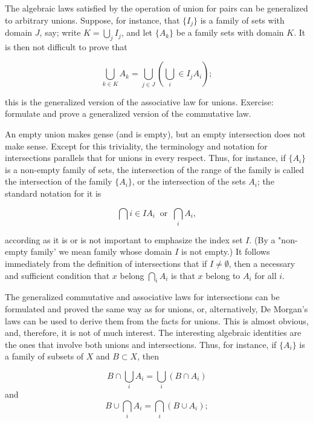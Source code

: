 The algebraic laws satisfied by the operation of union for pairs can be generalized to arbitrary unions. Suppose, for instance, that $ \{ I_{j} \}$ is a family of sets with domain $J$, say; write $K = \bigcup_{j}I_{j}$, and let $\{ A_{k} \}$ be a family sets with domain $K$. It is then not difficult to prove that 

\begin{equation*}
\bigcup_{k \in K}A_{k} = \bigcup_{j \in J}(\bigcup_{i} \in I_{j}A_{i});
\end{equation*}

this is the generalized version of the associative law for unions. Exercise: formulate and prove a generalized version of the commutative law. 

An empty union makes gense (and is empty), but an empty intersection does not make sense. Except for this triviality, the terminology and notation for intersections parallels that for unions in every respect. Thus, for instance, if $\{ A_{i} \}$ is a non-empty family of sets, the intersection of the range of the family is called the intersection of the family $\{ A_{i} \}$, or the intersection of the sets $A_{i}$; the standard notation for it is 

\begin{equation*}
\bigcap{i \in I}A_{i} \: \text{ or } \: \bigcap_{i}A_{i},
\end{equation*}

according as it is or is not important to emphasize the index set $I$. (By a "non-empty family' we mean family whose domain $I$ is not empty.) It follows immediately from the definition of intersections that if $I \neq \emptyset$, then a necessary and sufficient condition that $x$ belong $\bigcap_{i}A_{i}$ is that $x$ belong to $A_{i}$ for all $i$. 

The generalized commutative and associative laws for intersections can be formulated and proved the same way as for unions, or, alternatively, De Morgan's laws can be used to derive them from the facts for unions. This is almost obvious, and, therefore, it is not of much interest. The interesting algebraic identities are the ones that involve both unions and intersections. Thus, for instance, if $\{ A_{i} \}$ is a family of subsets of $X$ and $B \subset X$, then 

\begin{equation*}
B \cap \bigcup_{i}A_{i} = \bigcup_{i}(B \cap A_{i})
\end{equation*}
and
\begin{equation*}
B \cup \bigcap_{i}A_{i} = \bigcap_{i}(B \cup A_{i});
\end{equation*}

